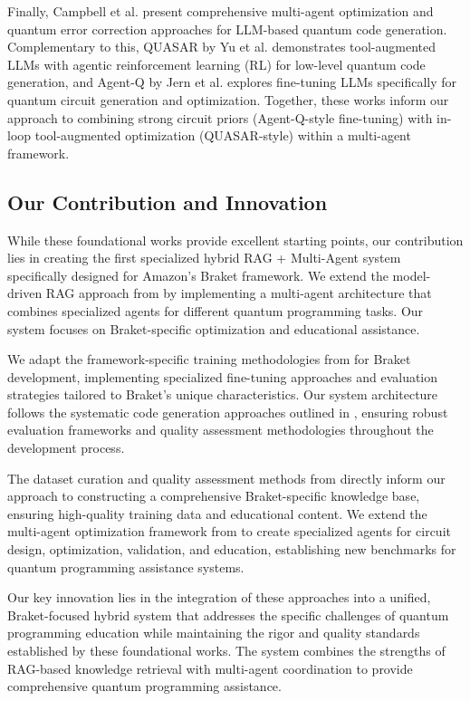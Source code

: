 \documentclass[runningheads]{llncs}
\begin{document}
Finally, Campbell et al. \cite{campbell2025enhancingllmbasedquantumcode} present comprehensive multi-agent optimization and quantum error correction approaches for LLM-based quantum code generation. Complementary to this, QUASAR by Yu et al. \cite{yu2025quasarquantumassemblycode} demonstrates tool-augmented LLMs with agentic reinforcement learning (RL) for low-level quantum code generation, and Agent-Q by Jern et al. \cite{jern2025agentqfinetuninglargelanguage} explores fine-tuning LLMs specifically for quantum circuit generation and optimization. Together, these works inform our approach to combining strong circuit priors (Agent-Q-style fine-tuning) with in-loop tool-augmented optimization (QUASAR-style) within a multi-agent framework.

\subsection{Our Contribution and Innovation}
While these foundational works provide excellent starting points, our contribution lies in creating the first specialized hybrid RAG + Multi-Agent system specifically designed for Amazon's Braket framework. We extend the model-driven RAG approach from \cite{siavash2025modeldrivenquantumcodegeneration} by implementing a multi-agent architecture that combines specialized agents for different quantum programming tasks. Our system focuses on Braket-specific optimization and educational assistance.

We adapt the framework-specific training methodologies from \cite{10691762} for Braket development, implementing specialized fine-tuning approaches and evaluation strategies tailored to Braket's unique characteristics. Our system architecture follows the systematic code generation approaches outlined in \cite{jimenez2025codegeneration}, ensuring robust evaluation frameworks and quality assessment methodologies throughout the development process.

The dataset curation and quality assessment methods from \cite{basit2025pennylangpioneeringllmbasedquantum} directly inform our approach to constructing a comprehensive Braket-specific knowledge base, ensuring high-quality training data and educational content. We extend the multi-agent optimization framework from \cite{campbell2025enhancingllmbasedquantumcode} to create specialized agents for circuit design, optimization, validation, and education, establishing new benchmarks for quantum programming assistance systems.

Our key innovation lies in the integration of these approaches into a unified, Braket-focused hybrid system that addresses the specific challenges of quantum programming education while maintaining the rigor and quality standards established by these foundational works. The system combines the strengths of RAG-based knowledge retrieval with multi-agent coordination to provide comprehensive quantum programming assistance.
\end{document}

